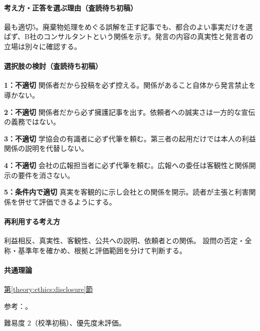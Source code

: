\paragraph{考え方・正答を選ぶ理由（査読待ち初稿）} 最も適切5。廃棄物処理をめぐる誤解を正す記事でも、都合のよい事実だけを選ばず、B社のコンサルタントという関係を示す。発言の内容の真実性と発言者の立場は別々に確認する。

\paragraph{選択肢の検討（査読待ち初稿）}\mbox{}\par

\noindent\textbf{1：不適切} 関係者だから投稿を必ず控える。関係があること自体から発言禁止を導かない。\par

\noindent\textbf{2：不適切} 関係者だから必ず擁護記事を出す。依頼者への誠実さは一方的な宣伝の義務ではない。\par

\noindent\textbf{3：不適切} 学協会の有識者に必ず代筆を頼む。第三者の起用だけでは本人の利益関係の説明を代替しない。\par

\noindent\textbf{4：不適切} 会社の広報担当者に必ず代筆を頼む。広報への委任は客観性と関係開示の要件を消さない。\par

\noindent\textbf{5：条件内で適切} 真実を客観的に示し会社との関係を開示。読者が主張と利害関係を併せて評価できるようにする。\par

\paragraph{再利用する考え方} 利益相反、真実性、客観性、公共への説明、依頼者との関係。 設問の否定・全称・基準年を確かめ、根拠と評価範囲を分けて判断する。

\paragraph{共通理論} \hyperref[theory:ethics:disclosure]{第\ref*{theory:ethics:disclosure}節}

\par 参考：\cite{ipej_ethics2011,scu_ethics_framework}。

\par 難易度 2（校準初稿）、優先度未評価。

